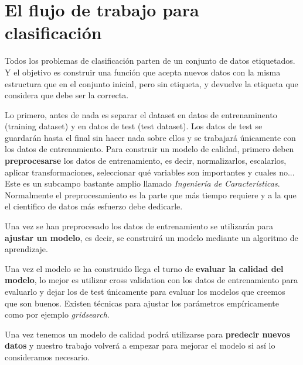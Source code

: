 \section{El flujo de trabajo para clasificación}

Todos los problemas de clasificación parten de un conjunto de datos etiquetados. Y el objetivo es construir una función que acepta nuevos datos con la misma estructura que en el conjunto inicial, pero sin etiqueta, y devuelve la etiqueta que considera que debe ser la correcta.  

Lo primero, antes de nada es separar el dataset en datos de entrenaminento (training dataset) y en datos de test (test dataset).  
Los datos de test se guardarán hasta el final sin hacer nada sobre ellos y se trabajará únicamente con los datos de entrenamiento.  
Para construir un modelo de calidad, primero deben \textbf{preprocesarse} los datos de entrenamiento, es decir, normalizarlos, escalarlos, aplicar transformaciones, seleccionar qué variables son importantes y cuales no...
Este es un subcampo bastante amplio llamado \textit{Ingeniería de Características}.  
Normalmente el preprocesamiento es la parte que más tiempo requiere y a la que el cientifico de datos más esfuerzo debe dedicarle.

Una vez se han preprocesado los datos de entrenamiento se utilizarán para \textbf{ajustar un modelo}, es decir, se construirá un modelo mediante un algoritmo de aprendizaje.

Una vez el modelo se ha construido llega el turno de \textbf{evaluar la calidad del modelo}, lo mejor es utilizar cross validation con los datos de entrenamiento para evaluarlo y dejar los de test únicamente para evaluar los modelos que creemos que son buenos.  
Existen técnicas para ajustar los parámetros empíricamente como por ejemplo \textit{gridsearch}.

Una vez tenemos un modelo de calidad podrá utilizarse para \textbf{predecir nuevos datos} y nuestro trabajo volverá a empezar para mejorar el modelo si así lo consideramos necesario.  

